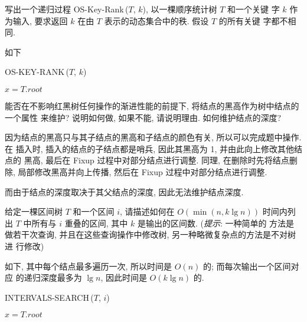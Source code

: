 \documentclass[boxes]{homework}
\begin{document}
\begin{problem}
写出一个递归过程 {\sc OS-Key-Rank}\,($T$, $k$), 以一棵顺序统计树 $T$ 和一个关键
字 $k$ 作为输入, 要求返回 $k$ 在由 $T$ 表示的动态集合中的秩. 假设 $T$ 的所有关键
字都不相同.
\end{problem}
\begin{solution}
    如下
    \begin{algo}
        \caption{OS-KEY-RANK\,($T$, $k$)}
        $x = T.root$\;
    \end{algo}
\end{solution}

\begin{problem}
能否在不影响红黑树任何操作的渐进性能的前提下, 将结点的黑高作为树中结点的一个属性
来维护? 说明如何做, 如果不能, 请说明理由. 如何维护结点的深度?
\end{problem}
\begin{solution}
    因为结点的黑高只与其子结点的黑高和子结点的颜色有关, 所以可以完成题中操作. 在
    插入时, 插入的结点的子结点都是哨兵, 因此其黑高为 1, 并由此向上修改其他结点的
    黑高, 最后在 {\sc Fixup} 过程中对部分结点进行调整. 同理, 在删除时先将结点删
    除, 局部修改黑高并向上传播, 然后在 {\sc Fixup} 过程中对部分结点进行调整.

    而由于结点的深度取决于其父结点的深度, 因此无法维护结点深度.
\end{solution}

\begin{problem}
给定一棵区间树 $T$ 和一个区间 $i$, 请描述如何在 $O(\min(n, k\lg n))$ 时间内列出
$T$ 中所有与 $i$ 重叠的区间, 其中 $k$ 是输出的区间数. (\textit{提示}: 一种简单的
方法是做若干次查询, 并且在这些查询操作中修改树, 另一种略微复杂点的方法是不对树进
行修改)
\end{problem}
\begin{solution}
    如下, 其中每个结点最多遍历一次, 所以时间是 $O(n)$ 的; 而每次输出一个区间对应
    的递归深度最多为 $\lg n$, 因此时间是 $O(k\lg n)$ 的.
    \begin{algo}
        \caption{INTERVALS-SEARCH\,($T$, $i$)}
        $x = T.root$\;
    \end{algo}
\end{solution}
\end{document}
